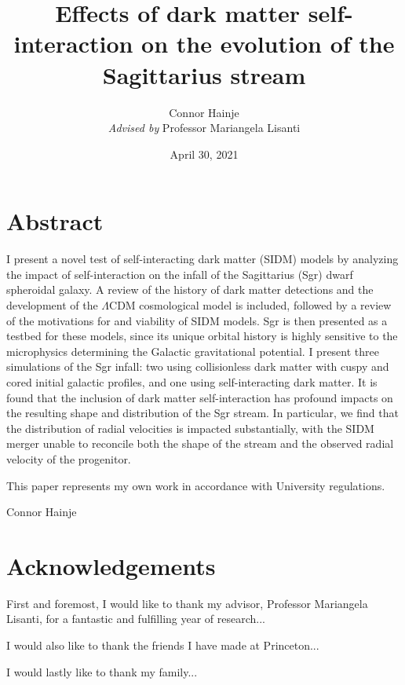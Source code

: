 \documentclass[12pt,oneside]{book}
\title{Effects of dark matter self-interaction on the evolution of the Sagittarius stream}
\author{Connor Hainje\\\textit{Advised by} Professor Mariangela Lisanti}
\date{April 30, 2021}
\begin{document}
\maketitle

\onehalfspacing
{}

\chapter*{Abstract}

I present a novel test of self-interacting dark matter (SIDM) models by
analyzing the impact of self-interaction on the infall of the Sagittarius
(Sgr) dwarf spheroidal galaxy.  A review of the history of dark matter
detections and the development of the $\Lambda$CDM cosmological model is
included, followed by a review of the motivations for and viability of SIDM
models. Sgr is then presented as a testbed for these models, since its unique
orbital history is highly sensitive to the microphysics determining the Galactic
gravitational potential. I present three simulations of the Sgr infall: two
using collisionless dark matter with cuspy and cored initial galactic profiles,
and one using self-interacting dark matter.  It is found that the inclusion of
dark matter self-interaction has profound impacts on the resulting shape and
distribution of the Sgr stream.  In particular, we find that the distribution of
radial velocities is impacted substantially, with the SIDM merger unable to
reconcile both the shape of the stream and the observed radial velocity of the
progenitor. 

\vspace{0.25in}
This paper represents my own work in accordance with University regulations.

\vspace{0.35in}
\hspace{3.5in}Connor Hainje

\newpage

\chapter*{Acknowledgements}

First and foremost, I would like to thank my advisor, Professor Mariangela
Lisanti, for a fantastic and fulfilling year of research...

I would also like to thank the friends I have made at Princeton...

I would lastly like to thank my family...

\newpage

\singlespacing
\tableofcontents 
\newpage

\onehalfspacing








\printbibliography
\end{document}
